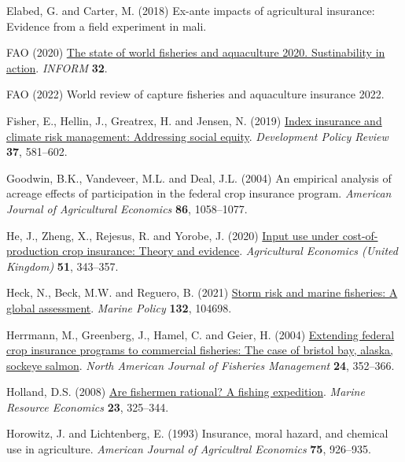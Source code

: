 \documentclass[
  letterpaper,
  DIV=11,
  numbers=noendperiod]{scrartcl}
\newlength{\cslhangindent}
\newlength{\cslentryspacingunit} %
\newenvironment{CSLReferences}[2] %
 {%
  \setlength{\parindent}{0pt}
  \ifodd #1
  \let\oldpar\par
  \def\par{\hangindent=\cslhangindent\oldpar}
  \fi
  \setlength{\parskip}{#2\cslentryspacingunit}
 }%
 {}
\theoremstyle{plain}
\theoremstyle{plain}
\theoremstyle{remark}
\begin{document}
\begin{CSLReferences}{1}{0}
\leavevmode{}%
Elabed, G. and Carter, M. (2018) Ex-ante impacts of agricultural
insurance: Evidence from a field experiment in mali.

\leavevmode{}%
FAO (2020) \href{https://doi.org/10.4060/ca9229en}{The state of world
fisheries and aquaculture 2020. Sustinability in action}. \emph{INFORM}
\textbf{32}.

\leavevmode{}%
FAO (2022) World review of capture fisheries and aquaculture insurance
2022.

\leavevmode{}%
Fisher, E., Hellin, J., Greatrex, H. and Jensen, N. (2019)
\href{https://doi.org/10.1111/dpr.12387}{Index insurance and climate
risk management: Addressing social equity}. \emph{Development Policy
Review} \textbf{37}, 581--602.

\leavevmode{}%
Goodwin, B.K., Vandeveer, M.L. and Deal, J.L. (2004) An empirical
analysis of acreage effects of participation in the federal crop
insurance program. \emph{American Journal of Agricultural Economics}
\textbf{86}, 1058--1077.

\leavevmode{}%
He, J., Zheng, X., Rejesus, R. and Yorobe, J. (2020)
\href{https://doi.org/10.1111/AGEC.12558}{Input use under
cost-of-production crop insurance: Theory and evidence}.
\emph{Agricultural Economics (United Kingdom)} \textbf{51}, 343--357.

\leavevmode{}%
Heck, N., Beck, M.W. and Reguero, B. (2021)
\href{https://doi.org/10.1016/j.marpol.2021.104698}{Storm risk and
marine fisheries: A global assessment}. \emph{Marine Policy}
\textbf{132}, 104698.

\leavevmode{}%
Herrmann, M., Greenberg, J., Hamel, C. and Geier, H. (2004)
\href{https://doi.org/10.1577/M02-086.1}{Extending federal crop
insurance programs to commercial fisheries: The case of bristol bay,
alaska, sockeye salmon}. \emph{North American Journal of Fisheries
Management} \textbf{24}, 352--366.

\leavevmode{}%
Holland, D.S. (2008)
\href{https://doi.org/10.1086/mre.23.3.42629621}{Are fishermen rational?
A fishing expedition}. \emph{Marine Resource Economics} \textbf{23},
325--344.

\leavevmode{}%
Horowitz, J. and Lichtenberg, E. (1993) Insurance, moral hazard, and
chemical use in agriculture. \emph{American Journal of Agricultral
Economics} \textbf{75}, 926--935.


\end{CSLReferences}
\end{document}
